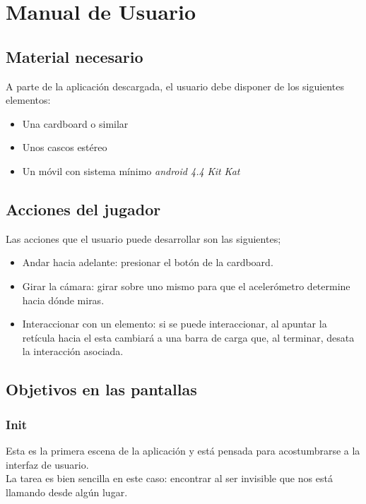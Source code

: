 \section{Manual de Usuario}

\subsection{Material necesario}

\quad A parte de la aplicación descargada, el usuario debe disponer de los siguientes elementos:
\begin{itemize}
	\item Una cardboard o similar
	\item Unos cascos estéreo
	\item Un móvil con sistema mínimo \textit{android 4.4 Kit Kat}
\end{itemize}

\subsection{Acciones del jugador}

\quad Las acciones que el usuario puede desarrollar son las siguientes;

\begin{itemize}
	\item Andar hacia adelante: presionar el botón de la cardboard.
	\item Girar la cámara: girar sobre uno mismo para que el acelerómetro determine hacia dónde miras.
	\item Interaccionar con un elemento: si se puede interaccionar, al apuntar la retícula hacia el esta cambiará a una barra de carga que, al terminar, desata la interacción asociada.
\end{itemize}

\subsection{Objetivos en las pantallas}

\subsubsection{Init}

\quad Esta es la primera escena de la aplicación y está pensada para acostumbrarse a la interfaz de usuario.\\

\quad La tarea es bien sencilla en este caso: encontrar al ser invisible que nos está llamando desde algún lugar.\\ 

